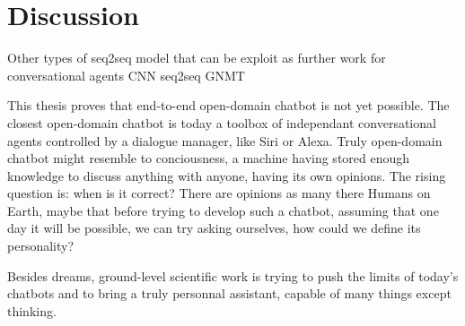 
\chapter{Discussion} %

\label{Chapter5} %

Other types of seq2seq model that can be exploit as further work for conversational agents
CNN seq2seq \cite{cnn-seq2seq-1705.03122}
GNMT \cite{gnmt-1609.08144}

This thesis proves that end-to-end open-domain chatbot is not yet possible. The closest open-domain chatbot is today a toolbox of independant conversational agents controlled by a dialogue manager, like Siri or Alexa. Truly open-domain chatbot might resemble to conciousness, a machine having stored enough knowledge to discuss anything with anyone, having its own opinions. The rising question is: when is it correct? There are opinions as many there Humans on Earth, maybe that before trying to develop such a chatbot, assuming that one day it will be possible, we can try asking ourselves, how could we define its personality?

Besides dreams, ground-level scientific work is trying to push the limits of today’s chatbots and to bring a truly personnal assistant, capable of many things except thinking.
